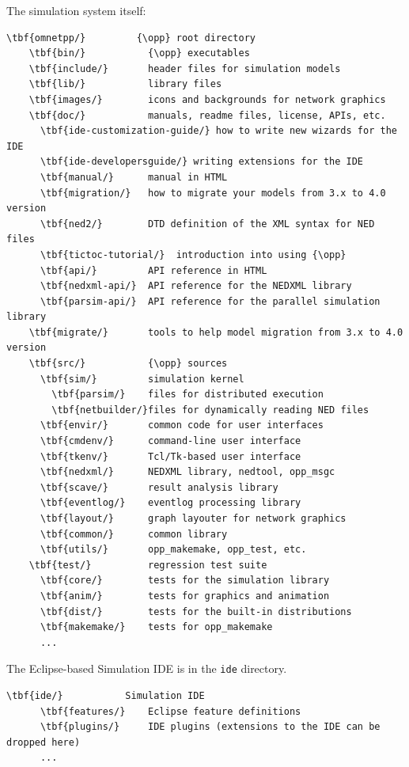 The simulation system itself:

\begin{Verbatim}[commandchars=\\\{\}]
  \tbf{omnetpp/}         {\opp} root directory
    \tbf{bin/}           {\opp} executables
    \tbf{include/}       header files for simulation models
    \tbf{lib/}           library files
    \tbf{images/}        icons and backgrounds for network graphics
    \tbf{doc/}           manuals, readme files, license, APIs, etc.
      \tbf{ide-customization-guide/} how to write new wizards for the IDE
      \tbf{ide-developersguide/} writing extensions for the IDE
      \tbf{manual/}      manual in HTML
      \tbf{migration/}   how to migrate your models from 3.x to 4.0 version
      \tbf{ned2/}        DTD definition of the XML syntax for NED files
      \tbf{tictoc-tutorial/}  introduction into using {\opp}
      \tbf{api/}         API reference in HTML
      \tbf{nedxml-api/}  API reference for the NEDXML library
      \tbf{parsim-api/}  API reference for the parallel simulation library
    \tbf{migrate/}       tools to help model migration from 3.x to 4.0 version
    \tbf{src/}           {\opp} sources
      \tbf{sim/}         simulation kernel
        \tbf{parsim/}    files for distributed execution
        \tbf{netbuilder/}files for dynamically reading NED files
      \tbf{envir/}       common code for user interfaces
      \tbf{cmdenv/}      command-line user interface
      \tbf{tkenv/}       Tcl/Tk-based user interface
      \tbf{nedxml/}      NEDXML library, nedtool, opp_msgc
      \tbf{scave/}       result analysis library
      \tbf{eventlog/}    eventlog processing library
      \tbf{layout/}      graph layouter for network graphics
      \tbf{common/}      common library
      \tbf{utils/}       opp_makemake, opp_test, etc.
    \tbf{test/}          regression test suite
      \tbf{core/}        tests for the simulation library
      \tbf{anim/}        tests for graphics and animation
      \tbf{dist/}        tests for the built-in distributions
      \tbf{makemake/}    tests for opp_makemake
      ...
\end{Verbatim}

The Eclipse-based Simulation IDE is in the \texttt{ide} directory.

\begin{Verbatim}[commandchars=\\\{\}]
    \tbf{ide/}           Simulation IDE
      \tbf{features/}    Eclipse feature definitions
      \tbf{plugins/}     IDE plugins (extensions to the IDE can be dropped here)
      ...
\end{Verbatim}

